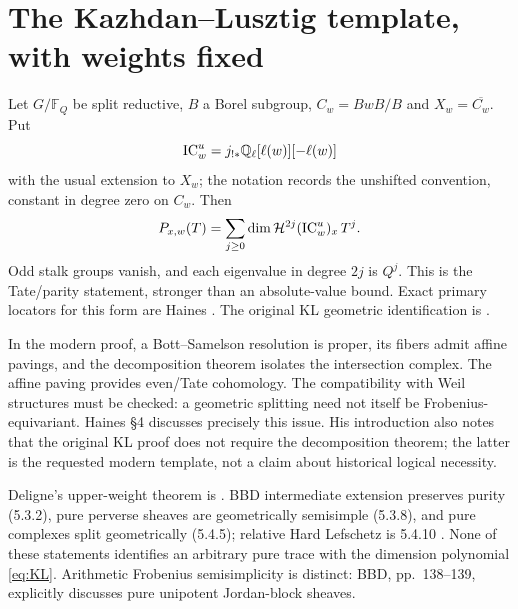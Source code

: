 \documentclass[11pt,a4paper]{article}
\newcommand{\Q}{\mathbb Q}\newcommand{\Z}{\mathbb Z}\newcommand{\C}{\mathbb C}\newcommand{\N}{\mathbb N}\newcommand{\F}{\mathbb F}
\theoremstyle{named}\newtheorem{finding}{Finding}[section]
\theoremstyle{definition}\newtheorem{definition}[finding]{Definition}
\theoremstyle{remark}\newtheorem{remark}[finding]{Remark}
\begin{document}
\section{The Kazhdan--Lusztig template, with weights fixed}\label{sec:KL}
Let $G/\F_Q$ be split reductive, $B$ a Borel subgroup, $C_w=BwB/B$ and $X_w=\overline{C_w}$. Put
\[
 \IC_w^u=j_{!*}\Q_\ell[\ell(w)][-\ell(w)]
\]
with the usual extension to $X_w$; the notation records the unshifted convention, constant in degree zero on $C_w$. Then
\begin{equation}\label{eq:KL}
 P_{x,w}(T)=\sum_{j\ge0}\dim\mathcal H^{2j}(\operatorname{IC}_w^u)_x\,T^j.
\end{equation}
Odd stalk groups vanish, and each eigenvalue in degree $2j$ is $Q^j$. This is the Tate/parity statement, stronger than an absolute-value bound. Exact primary locators for this form are Haines \cite[Theorems 2.0.1, 5.0.4; Proposition 3.0.2; \S4]{Haines}. The original KL geometric identification is \cite[Theorem 4.3]{KL}.

In the modern proof, a Bott--Samelson resolution is proper, its fibers admit affine pavings, and the decomposition theorem isolates the intersection complex. The affine paving provides even/Tate cohomology. The compatibility with Weil structures must be checked: a geometric splitting need not itself be Frobenius-equivariant. Haines \S4 discusses precisely this issue. His introduction also notes that the original KL proof does not require the decomposition theorem; the latter is the requested modern template, not a claim about historical logical necessity.

Deligne's upper-weight theorem is \cite[Theorem 3.3.1; Corollaries 3.3.4--3.3.6]{WeilII}. BBD intermediate extension preserves purity (5.3.2), pure perverse sheaves are geometrically semisimple (5.3.8), and pure complexes split geometrically (5.4.5); relative Hard Lefschetz is 5.4.10 \cite{BBD}. None of these statements identifies an arbitrary pure trace with the dimension polynomial \eqref{eq:KL}. Arithmetic Frobenius semisimplicity is distinct: BBD, pp.~138--139, explicitly discusses pure unipotent Jordan-block sheaves.
\end{document}
